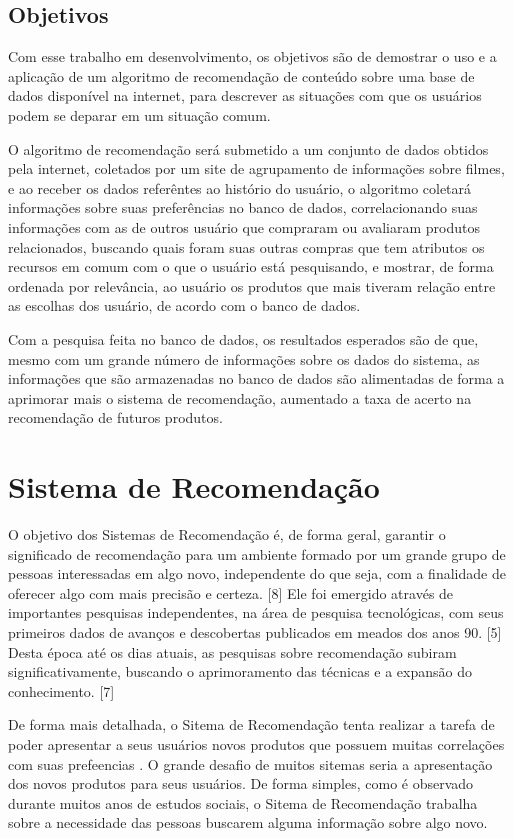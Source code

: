 \documentclass[12pt,
				openright,
				twoside,
				a4paper,
				apter=TITLE,
				section=TITLE,
				subsection=TITLE,
				chapter=TITLE,
				english,
				brazil]{abntex2}
\begin{document}
\section{Objetivos}
Com esse trabalho em desenvolvimento, os objetivos são de demostrar o uso e a aplicação de um algoritmo de recomendação de conteúdo sobre uma base de dados disponível na internet, para descrever as situações com que os usuários podem se deparar em um situação comum.

O algoritmo de recomendação será submetido a um conjunto de dados obtidos pela internet, coletados por um site  de agrupamento de informações sobre filmes, e ao receber os dados referêntes ao histório do usuário, o algoritmo coletará informações sobre suas preferências no banco de dados, correlacionando suas  informações com as de outros usuário que compraram ou avaliaram produtos relacionados, buscando quais foram suas outras  compras que tem atributos os recursos em comum com o que o usuário está pesquisando, e mostrar, de forma ordenada por relevância, ao  usuário os produtos que mais tiveram relação entre as escolhas dos usuário, de acordo com o banco de dados.

Com a pesquisa feita no banco de dados, os resultados esperados são de que, mesmo com um grande número de informações sobre os dados do sistema, as informações que são armazenadas no banco de dados são alimentadas de forma a aprimorar mais o sistema de recomendação, aumentado a taxa de acerto na recomendação de futuros produtos.

\chapter{Sistema de Recomendação}
O objetivo dos Sistemas de Recomendação é, de forma geral, garantir o significado de recomendação para um ambiente formado por um grande grupo de pessoas interessadas em algo novo, independente do que seja, com a finalidade de oferecer algo com mais precisão e certeza. [8] Ele foi emergido através de importantes pesquisas independentes, na área de pesquisa tecnológicas, com seus primeiros dados de avanços e descobertas publicados em meados dos anos 90. [5] Desta época até os dias atuais, as pesquisas sobre recomendação subiram significativamente, buscando o aprimoramento das técnicas e a expansão do conhecimento. [7]

De forma mais detalhada, o Sitema de Recomendação tenta realizar a tarefa de poder apresentar a seus usuários novos produtos que possuem muitas correlações com suas prefeencias \cite{resnick1997recommender}. O grande desafio de muitos sitemas seria a apresentação dos novos produtos para seus usuários. De forma simples, como é observado durante muitos anos de estudos sociais, o Sitema de Recomendação trabalha sobre a necessidade das pessoas buscarem alguma informação sobre algo novo. 
\end{document}
